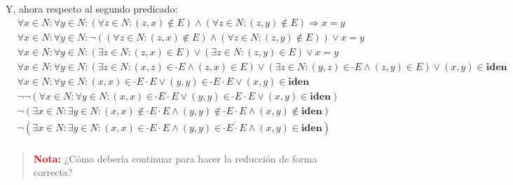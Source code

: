 \documentclass{article}
\newcommand{\iden}{\textbf{iden}}
\newcommand{\conv}[1]{\ \tilde{}#1}
\begin{document}
Y, ahora respecto al segundo predicado:
\begin{equation*}
  \begin{aligned}
    &\forall x \in N : \forall y \in N : (\forall z \in N : (z, x) \notin E) \land (\forall z \in N : (z, y) \notin E) \Rightarrow x = y \\ 
    &\forall x \in N : \forall y \in N : \neg((\forall z \in N : (z, x) \notin E) \land (\forall z \in N : (z, y) \notin E)) \lor x = y \\ 
    &\forall x \in N : \forall y \in N : (\exists z \in N : (z, x) \in E) \lor (\exists z \in N : (z, y) \in E) \lor x = y \\ 
    &\forall x \in N : \forall y \in N : (\exists z \in N : (x, z) \in \conv{E} \land (z, x) \in E) \lor (\exists z \in N : (y, z) \in \conv{E} \land (z, y) \in E) \lor (x, y) \in \iden \\ 
    &\forall x \in N : \forall y \in N : (x, x) \in \conv{E} \cdot E \lor (y, y) \in \conv{E} \cdot E \lor (x, y) \in \iden \\ 
    &\neg\neg(\forall x \in N : \forall y \in N : (x, x) \in \conv{E} \cdot E \lor (y, y) \in \conv{E} \cdot E \lor (x, y) \in \iden) \\ 
    &\neg(\exists x \in N : \exists y \in N : (x, x) \notin \conv{E} \cdot E \land (y, y) \notin \conv{E} \cdot E \land (x, y) \notin \iden) \\ 
    &\neg(\exists x \in N : \exists y \in N : (x, x) \in \overline{\conv{E} \cdot E} \land (y, y) \in \overline{\conv{E} \cdot E} \land (x, y) \in \overline{\iden}) \\ 
  \end{aligned}
\end{equation*}

\begin{quotation}
  \textcolor{red}{\textbf{Nota:}} ¿Cómo debería continuar para hacer la reducción de forma correcta?
\end{quotation}
\end{document}
